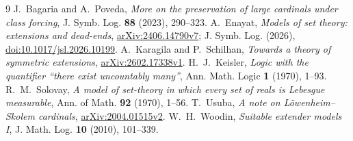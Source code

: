 \documentclass[11pt,a4paper]{amsart}
\begin{document}
\begin{thebibliography}{9}
 J.~Bagaria and A.~Poveda, \emph{More on the preservation of large cardinals under class forcing}, J. Symb. Log. \textbf{88} (2023), 290--323.
 A.~Enayat, \emph{Models of set theory: extensions and dead-ends}, \href{https://arxiv.org/abs/2406.14790v7}{arXiv:2406.14790v7}; J. Symb. Log. (2026), \href{https://doi.org/10.1017/jsl.2026.10199}{doi:10.1017/jsl.2026.10199}.
 A.~Karagila and P.~Schilhan, \emph{Towards a theory of symmetric extensions}, \href{https://arxiv.org/abs/2602.17338v1}{arXiv:2602.17338v1}.
 H.~J.~Keisler, \emph{Logic with the quantifier ``there exist uncountably many''}, Ann. Math. Logic \textbf{1} (1970), 1--93.
 R.~M.~Solovay, \emph{A model of set-theory in which every set of reals is Lebesgue measurable}, Ann. of Math. \textbf{92} (1970), 1--56.
 T.~Usuba, \emph{A note on L\"owenheim--Skolem cardinals}, \href{https://arxiv.org/abs/2004.01515v2}{arXiv:2004.01515v2}.
 W.~H.~Woodin, \emph{Suitable extender models I}, J. Math. Log. \textbf{10} (2010), 101--339.
\end{thebibliography}
\end{document}
